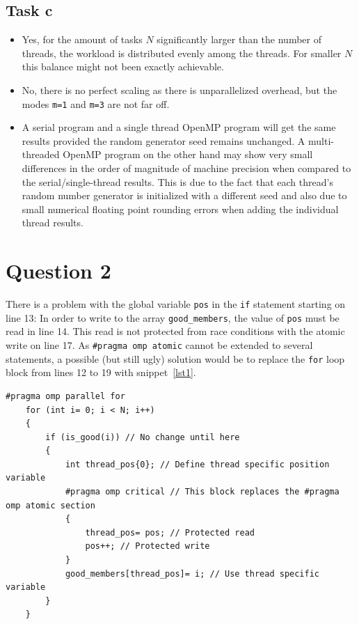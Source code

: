\documentclass[11pt,a4paper]{article}
\begin{document}
\subsection{Task c}
\begin{itemize}
    \item Yes, for the amount of tasks $N$ significantly larger than the number of threads, the workload is distributed evenly among the threads. For smaller $N$ this balance might not been exactly achievable.
    \item No, there is no perfect scaling as there is unparallelized overhead, but the modes \texttt{m=1} and \texttt{m=3} are not far off.
    \item A serial program and a single thread OpenMP program will get the same results provided the random generator seed remains unchanged. A multi-threaded OpenMP program on the other hand may show very small differences in the order of magnitude of machine precision when compared to the serial/single-thread results. This is due to the fact that each thread's random number generator is initialized with a different seed and also due to small numerical floating point rounding errors when adding the individual thread results.
\end{itemize}

\section{Question 2}

There is a problem with the global variable \texttt{pos} in the \texttt{if} statement starting on line 13: In order to write to the array \texttt{good\_members}, the value of \texttt{pos}
must be read in line 14. This read is not protected from race conditions with the atomic write on line 17. As \texttt{\#pragma omp atomic} cannot be extended to several statements, a possible (but still ugly)
solution would be to replace the \texttt{for} loop block from lines 12 to 19 with snippet~\ref{lst1}.

\begin{lstlisting}[float, caption={Proposed modification for correctness in task 2.}, label={lst1}]
    #pragma omp parallel for
    for (int i= 0; i < N; i++)
    {
        if (is_good(i)) // No change until here
        {
            int thread_pos{0}; // Define thread specific position variable
            #pragma omp critical // This block replaces the #pragma omp atomic section
            {
                thread_pos= pos; // Protected read
                pos++; // Protected write
            }
            good_members[thread_pos]= i; // Use thread specific variable
        }
    }
\end{lstlisting}
\end{document}
